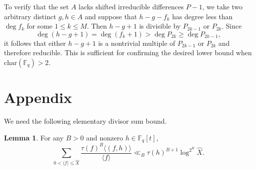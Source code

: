 \documentclass{article}
\theoremstyle{definition}
\newtheorem{lem}{Lemma}[section]
\theoremstyle{definition}
\theoremstyle{remark}
\newcommand{\F}{\mathbb{F}_q[t]}
\newcommand{\1}{\mathbf{1}}
\numberwithin{equation}{section}
\begin{document}
To verify that the set $A$ lacks shifted irreducible differences $P-1$, we take two arbitrary distinct $g,h\in A$ and suppose that $h-g-f_k$ has degree less than $\deg f_k$ for some $1\le k\le M$. Then $h-g+1$ is divisible by $P_{2k-1}$ or $P_{2k}$. Since
\[\deg(h-g+1)=\deg(f_k+1)>\deg P_{2k}\ge \deg P_{2k-1},\]
it follows that either $h-g+1$ is a nontrivial multiple of $P_{2k-1}$ or $P_{2k}$ and therefore reducible. This is sufficient for confirming the desired lower bound when $\text{char}(\mathbb{F}_q)>2$.


\section{Appendix}

We need the following elementary divisor sum bound. 
\begin{lem}\label{rankinbound}
For any $B>0$ and nonzero $h\in\F$,
\[\sum_{0<\langle f \rangle \leq \widehat{X}}\frac{\tau(f)^B\langle (f,h) \rangle }{\langle f\rangle }\ll_B \tau(h)^{B+1}\log^{2^B}\widehat{X}.\]
\end{lem}
\end{document}
